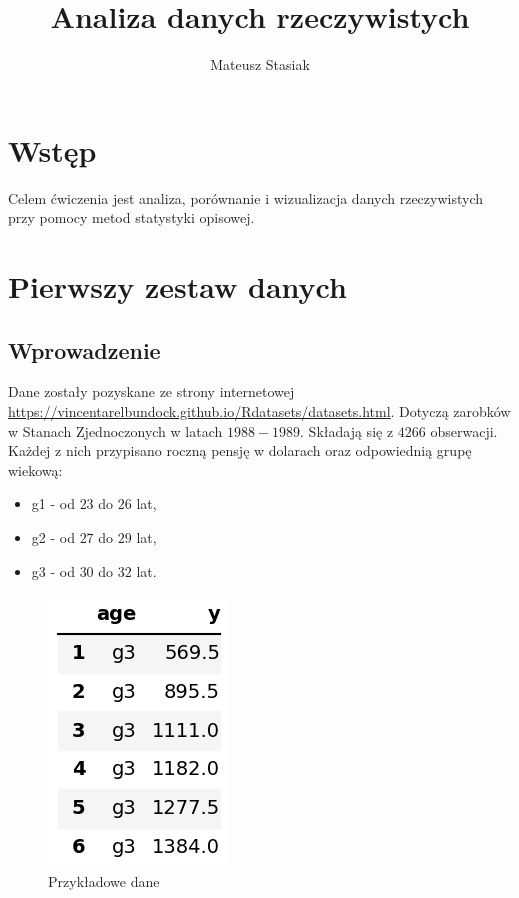 \documentclass[12pt]{mwart}
\author{Mateusz Stasiak}
\title{Analiza danych rzeczywistych}
\begin{document}
\maketitle





\section{Wstęp}
\noindent Celem ćwiczenia jest analiza, porównanie i wizualizacja danych rzeczywistych przy pomocy metod statystyki opisowej. \\





\section{Pierwszy zestaw danych}
\subsection{Wprowadzenie}
\noindent Dane zostały pozyskane ze strony internetowej \url{https://vincentarelbundock.github.io/Rdatasets/datasets.html}. Dotyczą zarobków w Stanach Zjednoczonych w latach $1988-1989$. Składają się z $4266$ obserwacji. Każdej z nich przypisano roczną pensję w dolarach oraz odpowiednią grupę wiekową:
\begin{itemize}
	\item g1 - od $23$ do $26$ lat,
	\item g2 - od $27$ do $29$ lat,
	\item g3 - od $30$ do $32$ lat.
\end{itemize}

\begin{figure}[H]
	\begin{center}
	\includegraphics[scale=0.6]{head.png}
	\caption{Przykładowe dane}
	\end{center}
\end{figure}
\end{document}
